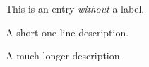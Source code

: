 \documentclass{article}
\begin{document}
\begin{description}
   \item This is an entry \textit{without} a label.
   \item[Something short] A short one-line description.
   \item[Something long] A much longer description. \blindtext[1]
\end{description}
\end{document}
